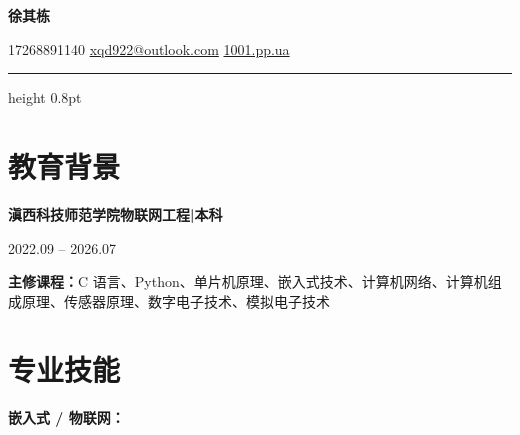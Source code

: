 \documentclass[10pt,a4paper]{article}
\begin{document}
\begin{center}
    {\fontsize{24}{28}\selectfont\bfseries\color{primary} 徐其栋}

    \vspace{0.1em}

    {\color{graytext}
    \faPhone\hspace{0.3em}17268891140
    \hspace{1.2em}
    \faEnvelope\hspace{0.3em}\href{mailto:xqd922@outlook.com}{xqd922@outlook.com}
    \hspace{1.2em}
    \faGlobe\hspace{0.3em}\href{https://1001.pp.ua}{1001.pp.ua}}

\end{center}

\vspace{0.2em}
{\color{rulecolor}\hrule height 0.8pt}

\section{\faGraduationCap\hspace{0.4em}教育背景}

{\bfseries 滇西科技师范学院}\hfill{\bfseries 物联网工程\hspace{0.3em}|\hspace{0.3em}本科}

{\color{graytext} 2022.09 -- 2026.07}

\vspace{0.2em}

{\color{darktext}\textbf{主修课程：}C 语言、Python、单片机原理、嵌入式技术、计算机网络、计算机组成原理、传感器原理、数字电子技术、模拟电子技术}

\section{\faCogs\hspace{0.4em}专业技能}

{\bfseries\color{primary}嵌入式 / 物联网：}

\vspace{2pt}
\end{document}
